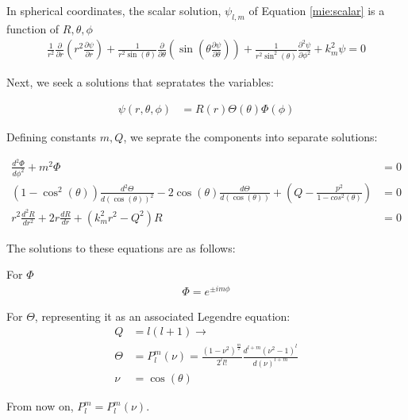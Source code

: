             In spherical coordinates, the scalar solution, $\psi_{l,m}$ of Equation \ref{mie:scalar} is a function of ${R, \theta, \phi}$
            \begin{align}
                \frac{1}{r^2}\frac{\partial}{\partial r}\left(r^2\frac{\partial\psi}{\partial r}\right)
                    + \frac{1}{r^2\sin(\theta)}\frac{\partial}{\partial\theta}\left(\sin(\theta\frac{\partial\psi}{\partial\theta})\right)
                    + \frac{1}{r^2\sin^2(\theta)}\frac{\partial^2\psi}{\partial\phi^2} + k^2_m\psi = 0
            \end{align}

            Next, we seek a solutions that sepratates the variables:

            \begin{align}
                \psi(r,\theta,\phi) &= R(r)\Theta(\theta)\Phi(\phi)
            \end{align}

            Defining constants $m, Q$, we seprate the components into separate solutions:

            \begin{align}
                \frac{d^2\Phi}{d\phi^2} + m^2\Phi &= 0 \\
                (1 - \cos^2(\theta))\frac{d^2\Theta}{d(\cos(\theta))^2} - 2\cos(\theta)\frac{d\Theta}{d(\cos(\theta))}
                    + (Q - \frac{p^2}{1-cos^2(\theta)}) &= 0 \\
                r^2\frac{d^2R}{dr^2} + 2r\frac{dR}{dr} + (k^2_mr^2 - Q^2)R &= 0
            \end{align}

            The solutions to these equations are as follows:

            For $\Phi$
            \begin{align}
                \Phi = e^{\pm i m \phi}
            \end{align}

            For $\Theta$, representing it as an associated Legendre equation:
            \begin{align}
                Q &= l(l+1) \rightarrow \\
                \Theta &= P^m_l(\nu) = \frac{(1-\nu^2)^{\frac{m}{2}}}{2^l l!}\frac{d^{l+m}(\nu^2-1)^l}{d(\nu)^{l+m}} \\
                \nu &= \cos(\theta)
            \end{align}

            From now on, $P_l^m = P_l^m(\nu)$.

